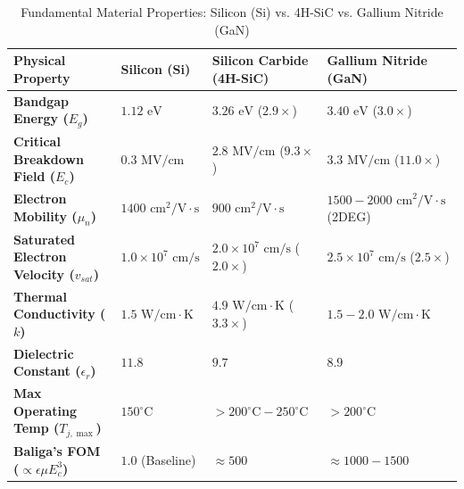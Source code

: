 \documentclass[11pt,a4paper]{article}
\begin{document}
\begin{table}[htbp]
\centering
\small
\caption{Fundamental Material Properties: Silicon (Si) vs. 4H-SiC vs. Gallium Nitride (GaN)}
\label{tab:wbg_properties}
\begin{tabularx}{\textwidth}{l Y Y Y}
\toprule
\textbf{Physical Property} & \textbf{Silicon (Si)} & \textbf{Silicon Carbide (4H-SiC)} & \textbf{Gallium Nitride (GaN)} \\
\midrule
\textbf{Bandgap Energy ($E_g$)} & $1.12\text{ eV}$ & $3.26\text{ eV}$ ($2.9\times$) & $3.40\text{ eV}$ ($3.0\times$) \\
\textbf{Critical Breakdown Field ($E_c$)} & $0.3\text{ MV/cm}$ & $2.8\text{ MV/cm}$ ($9.3\times$) & $3.3\text{ MV/cm}$ ($11.0\times$) \\
\textbf{Electron Mobility ($\mu_n$)} & $1400\text{ cm}^2/\text{V}\cdot\text{s}$ & $900\text{ cm}^2/\text{V}\cdot\text{s}$ & $1500 - 2000\text{ cm}^2/\text{V}\cdot\text{s}$ (2DEG) \\
\textbf{Saturated Electron Velocity ($v_{sat}$)} & $1.0 \times 10^7\text{ cm/s}$ & $2.0 \times 10^7\text{ cm/s}$ ($2.0\times$) & $2.5 \times 10^7\text{ cm/s}$ ($2.5\times$) \\
\textbf{Thermal Conductivity ($k$)} & $1.5\text{ W/cm}\cdot\text{K}$ & $4.9\text{ W/cm}\cdot\text{K}$ ($3.3\times$) & $1.5 - 2.0\text{ W/cm}\cdot\text{K}$ \\
\textbf{Dielectric Constant ($\epsilon_r$)} & $11.8$ & $9.7$ & $8.9$ \\
\textbf{Max Operating Temp ($T_{j,\max}$)} & $150^\circ\text{C}$ & $> 200^\circ\text{C} - 250^\circ\text{C}$ & $> 200^\circ\text{C}$ \\
\textbf{Baliga's FOM ($\propto \epsilon \mu E_c^3$)} & $1.0$ (Baseline) & $\approx 500$ & $\approx 1000 - 1500$ \\
\bottomrule
\end{tabularx}
\end{table}
\end{document}
